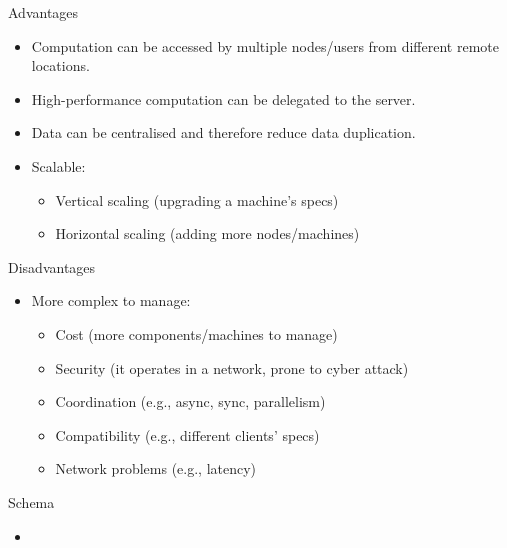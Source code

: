 \documentclass{beamer}
\begin{document}
\begin{frame}{Advantages}
\begin{itemize}
\item Computation can be accessed by multiple nodes/users from different remote locations.
\item High-performance computation can be delegated to the server.
\item Data can be centralised and therefore reduce data duplication.
\item Scalable:
\begin{itemize}
\item Vertical scaling (upgrading a machine's specs)
\item Horizontal scaling (adding more nodes/machines)
\end{itemize}
\end{itemize}
\end{frame}

\begin{frame}{Disadvantages}
\begin{itemize}
\item More complex to manage:
\begin{itemize}
\item Cost (more components/machines to manage)
\item Security (it operates in a network, prone to cyber attack)
\item Coordination (e.g., async, sync, parallelism)
\item Compatibility (e.g., different clients' specs)
\item Network problems (e.g., latency)
\end{itemize}
\end{itemize}
\end{frame}

\begin{frame}{Schema}
\begin{itemize}
\item
\end{itemize}
\end{frame}
\end{document}
